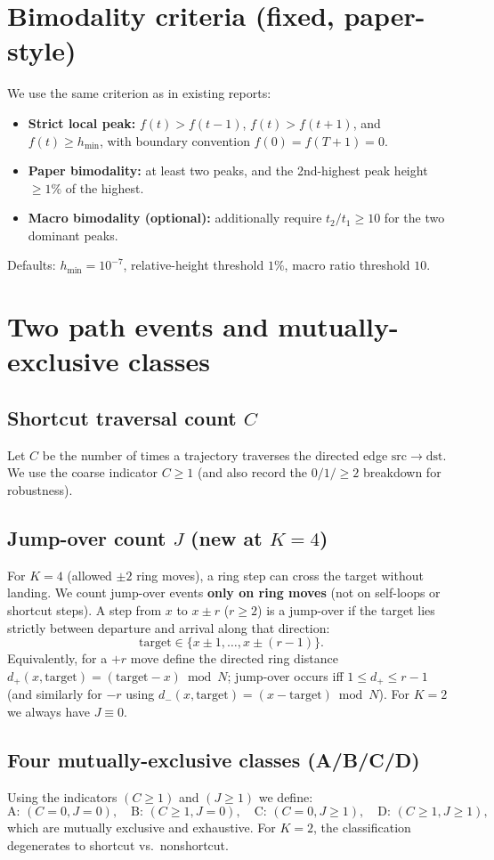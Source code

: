 \documentclass[11pt]{article}
\begin{document}
\section{Bimodality criteria (fixed, paper-style)}
We use the same criterion as in existing reports:
\begin{itemize}
  \item \textbf{Strict local peak:} $f(t)>f(t-1)$, $f(t)>f(t+1)$, and $f(t)\ge h_{\min}$, with boundary convention $f(0)=f(T+1)=0$.
  \item \textbf{Paper bimodality:} at least two peaks, and the 2nd-highest peak height $\ge 1\%$ of the highest.
  \item \textbf{Macro bimodality (optional):} additionally require $t_2/t_1\ge 10$ for the two dominant peaks.
\end{itemize}
Defaults: $h_{\min}=10^{-7}$, relative-height threshold $1\%$, macro ratio threshold $10$.

\section{Two path events and mutually-exclusive classes}
\subsection{Shortcut traversal count $C$}
Let $C$ be the number of times a trajectory traverses the directed edge $\mathrm{src}\to\mathrm{dst}$.
We use the coarse indicator $C\ge 1$ (and also record the $0/1/\ge 2$ breakdown for robustness).

\subsection{Jump-over count $J$ (new at $K=4$)}
For $K=4$ (allowed $\pm 2$ ring moves), a ring step can cross the target without landing.
We count jump-over events \textbf{only on ring moves} (not on self-loops or shortcut steps).
A step from $x$ to $x\pm r$ ($r\ge 2$) is a jump-over if the target lies strictly between departure and arrival along that direction:
\[
\mathrm{target}\in\{x\pm 1,\dots,x\pm(r-1)\}.
\]
Equivalently, for a $+r$ move define the directed ring distance $d_+(x,\mathrm{target})=(\mathrm{target}-x)\bmod N$; jump-over occurs iff $1\le d_+\le r-1$ (and similarly for $-r$ using $d_-(x,\mathrm{target})=(x-\mathrm{target})\bmod N$).
For $K=2$ we always have $J\equiv 0$.

\subsection{Four mutually-exclusive classes (A/B/C/D)}
Using the indicators $(C\ge 1)$ and $(J\ge 1)$ we define:
\[
\text{A: }(C=0,J=0),\quad
\text{B: }(C\ge 1,J=0),\quad
\text{C: }(C=0,J\ge 1),\quad
\text{D: }(C\ge 1,J\ge 1),
\]
which are mutually exclusive and exhaustive.
For $K=2$, the classification degenerates to shortcut vs.\ nonshortcut.
\end{document}

